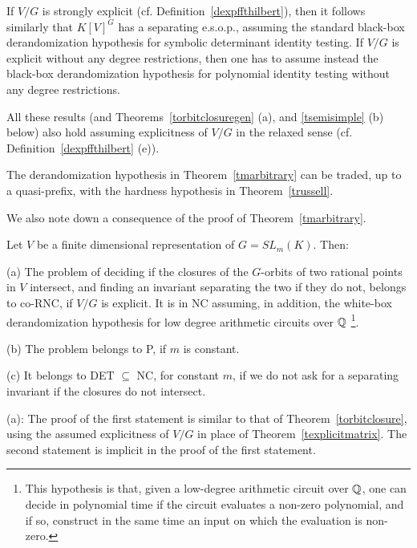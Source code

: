 \documentclass[11pt]{article}
\begin{document}
 If $V/G$ is strongly explicit
(cf. Definition~\ref{dexpffthilbert}), 
then it follows similarly that $K[V]^G$ has a separating e.s.o.p.,
assuming the standard 
black-box derandomization hypothesis for symbolic determinant identity testing. 
If $V/G$ is explicit without any degree restrictions, then one has to assume instead
the black-box derandomization hypothesis for polynomial  identity testing without
any degree restrictions. 

 All these results (and Theorems~\ref{torbitclosuregen} 
 (a), and \ref{tsemisimple} (b)  below) also hold 
assuming explicitness of $V/G$ in the relaxed sense
(cf. Definition~\ref{dexpffthilbert} (e)). 

The derandomization hypothesis in Theorem~\ref{tmarbitrary}  can be traded, up to a quasi-prefix, 
 with the hardness hypothesis in Theorem~\ref{trussell}.

We also note down a consequence of the proof of Theorem~\ref{tmarbitrary}.

\begin{theorem} \label{torbitclosuregen}
Let $V$ be a finite dimensional representation of $G=SL_m(K)$. Then:

\noindent (a) 
The  problem of deciding if the closures of the $G$-orbits of two rational points in $V$ 
intersect, and finding an invariant separating the two if they do not,
 belongs to co-RNC,  if $V/G$ is explicit. 
It is in NC assuming, in addition, the white-box derandomization hypothesis \cite{russell}
for low degree arithmetic circuits over $\mathbb{Q}$ \footnote{This hypothesis is that,
given a low-degree  arithmetic circuit over $\mathbb{Q}$, 
one can decide  in polynomial time if the circuit
evaluates a non-zero polynomial, and if so, construct in the same time
an input on which the evaluation is non-zero.}.

\noindent (b) The problem   belongs to P, if $m$ is constant. 

\noindent (c) It belongs to DET $\subseteq$ NC, for constant $m$,  
if we do not ask for a separating invariant if
the closures do not intersect. 
\end{theorem}

\proof \noindent (a):
The proof of the first statement  is similar to that of Theorem~\ref{torbitclosure}, using the assumed explicitness of $V/G$ 
in place of Theorem~\ref{texplicitmatrix}. The second statement is implicit in the proof of the
first statement.
\end{document}
